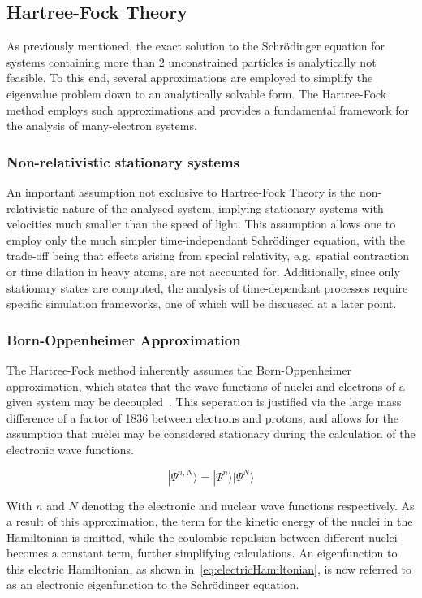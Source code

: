 \documentclass[11pt]{article}
\begin{document}
\bigskip

\subsection{Hartree-Fock Theory}
As previously mentioned, the exact solution to the Schrödinger equation for systems containing more than 2 unconstrained particles is analytically not feasible.
To this end, several approximations are employed to simplify the eigenvalue problem down to an analytically solvable form.
The Hartree-Fock method employs such approximations and provides a fundamental framework for the analysis of many-electron systems.

\subsubsection{Non-relativistic stationary systems}
An important assumption not exclusive to Hartree-Fock Theory is the non-relativistic nature of the analysed system, 
implying stationary systems with velocities much smaller than the speed of light.
This assumption allows one to employ only the much simpler time-independant Schrödinger equation, with the trade-off being that effects arising from special relativity, e.g.~spatial contraction or time dilation in heavy atoms, are not accounted for.
Additionally, since only stationary states are computed, the analysis of time-dependant processes require specific simulation frameworks, one of which will be discussed at a later point.

\subsubsection{Born-Oppenheimer Approximation}
The Hartree-Fock method inherently assumes the Born-Oppenheimer approximation, which states that the wave functions of nuclei and electrons of a given system may be decoupled~\cite{Born1927}.
This seperation is justified via the large mass difference of a factor of 1836 between electrons and protons, and allows for the assumption that nuclei may be considered stationary during the calculation of the electronic wave functions.

\begin{equation}
  |\Psi^{n, N}\rangle = |\Psi^{n}\rangle|\Psi^{N}\rangle 
\end{equation}

\bigskip

\noindent With $n$ and $N$ denoting the electronic and nuclear wave functions respectively. As a result of this approximation,
the term for the kinetic energy of the nuclei in the Hamiltonian is omitted, while the coulombic repulsion between different nuclei becomes a constant term, further simplifying calculations.
An eigenfunction to this electric Hamiltonian, as shown in~\ref{eq:electricHamiltonian},  is now referred to as an electronic eigenfunction to the Schrödinger equation.
\end{document}
